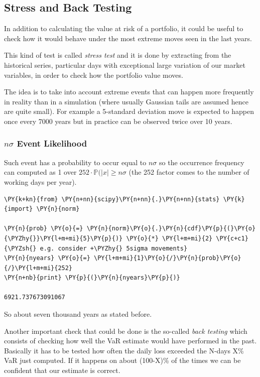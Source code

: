 \subsection{Stress and Back Testing}\label{stress-testing-and-back-testing}

In addition to calculating the value at risk of a portfolio, it could be useful to 
check how it would behave under the most extreme moves seen in the last years.

This kind of test is called \emph{stress test} and it is done by extracting from the historical series, particular days with exceptional large variation of our market variables, in order to check how the portfolio value moves.
 
The idea is to take into account extreme events that can happen more frequently in reality than in a simulation (where usually Gaussian tails are assumed hence are quite small). For example a 5-standard deviation move is expected to happen once every 7000 years but in practice can be observed twice over 10 years.

\begin{attention}
\subsubsection{$n\sigma$ Event Likelihood}
Such event has a probability to occur equal to $n\sigma$ so the occurrence frequency 
can computed as 1 over $252\cdot\mathbb{P}(|x| \ge n\sigma$ (the 252 factor comes to the number of working days per year).

\begin{Verbatim}[commandchars=\\\{\}]
\PY{k+kn}{from} \PY{n+nn}{scipy}\PY{n+nn}{.}\PY{n+nn}{stats} \PY{k}{import} \PY{n}{norm}

\PY{n}{prob} \PY{o}{=} \PY{n}{norm}\PY{o}{.}\PY{n}{cdf}\PY{p}{(}\PY{o}{\PYZhy{}}\PY{l+m+mi}{5}\PY{p}{)} \PY{o}{*} \PY{l+m+mi}{2} \PY{c+c1}{\PYZsh{} e.g. consider +\PYZhy{} 5sigma movements}
\PY{n}{nyears} \PY{o}{=} \PY{l+m+mi}{1}\PY{o}{/}\PY{n}{prob}\PY{o}{/}\PY{l+m+mi}{252}
\PY{n+nb}{print} \PY{p}{(}\PY{n}{nyears}\PY{p}{)}

6921.737673091067
\end{Verbatim}
\noindent
So about seven thousand years as stated before.
\end{attention}

Another important check that could be done is the so-called \emph{back testing}
which consists of checking how well the VaR estimate would have
performed in the past. Basically it has to be tested how often the daily
loss exceeded the N-days X\% VaR just computed. If it happens on about
(100-X)\% of the times we can be confident that our estimate is correct.

